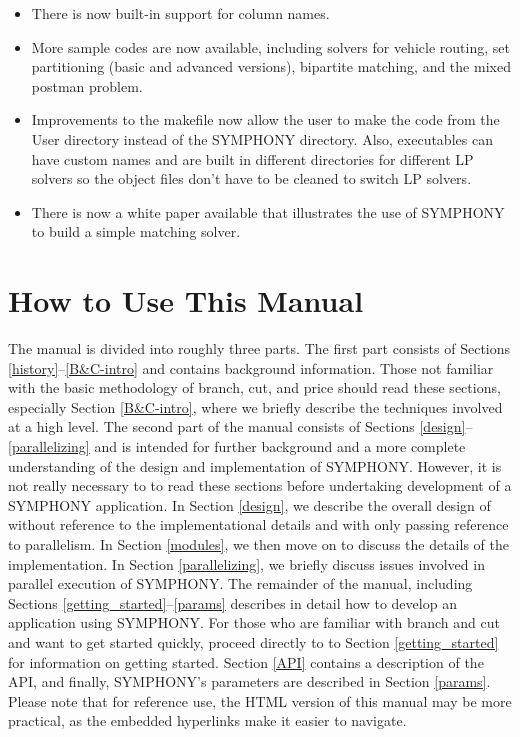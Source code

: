 \begin{itemize}
\item There is now built-in support for column names.

\item More sample codes are now available, including solvers for vehicle routing,
set partitioning (basic and advanced versions), bipartite matching, and the
mixed postman problem.

\item Improvements to the makefile now allow the user to make the code from the 
User directory instead of the SYMPHONY directory. Also, executables can have
custom names and are built in different directories for different LP solvers
so the object files don't have to be cleaned to switch LP solvers.

\item There is now a white paper available that illustrates the use of SYMPHONY
to build a simple matching solver.

\end{itemize}

\section{How to Use This Manual}

The manual is divided into roughly three parts. The first part consists of
Sections \ref{history}--\ref{B&C-intro} and contains background
information. Those not familiar with the basic methodology of branch, cut, and
price should read these sections, especially Section \ref{B&C-intro}, where we
briefly describe the techniques involved at a high level.  The second part of
the manual consists of Sections \ref{design}--\ref{parallelizing} and is
intended for further background and a more complete understanding of the
design and implementation of SYMPHONY. However, it is not really necessary to
to read these sections before undertaking development of a SYMPHONY
application. In Section \ref{design}, we describe the overall design of
without reference to the implementational details and with only passing
reference to parallelism.  In Section \ref{modules}, we then move on to
discuss the details of the implementation. In Section \ref{parallelizing}, we
briefly discuss issues involved in parallel execution of SYMPHONY. The
remainder of the manual, including Sections \ref{getting_started}--\ref{params}
describes in detail how to develop an application using SYMPHONY. For those
who are familiar with branch and cut and want to get started quickly, proceed
directly to to Section \ref{getting_started} for information on getting
started. Section \ref{API} contains a description of the API, and finally,
SYMPHONY's parameters are described in Section \ref{params}. Please note that
for reference use, the HTML version of this manual may be more practical, as
the embedded hyperlinks make it easier to navigate.

